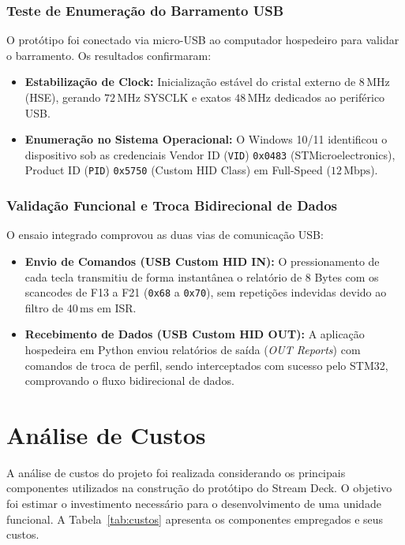 \documentclass[12pt, a4paper]{article}
\begin{document}
\subsubsection{Teste de Enumeração do Barramento USB}
O protótipo foi conectado via micro-USB ao computador hospedeiro para validar o barramento. Os resultados confirmaram:
\begin{itemize}
    \item \textbf{Estabilização de Clock:} Inicialização estável do cristal externo de $8\,\text{MHz}$ (HSE), gerando $72\,\text{MHz}$ SYSCLK e exatos $48\,\text{MHz}$ dedicados ao periférico USB.
    \item \textbf{Enumeração no Sistema Operacional:} O Windows 10/11 identificou o dispositivo sob as credenciais Vendor ID (\texttt{VID}) \texttt{0x0483} (STMicroelectronics), Product ID (\texttt{PID}) \texttt{0x5750} (Custom HID Class) em Full-Speed ($12\,\text{Mbps}$).
\end{itemize}

\subsubsection{Validação Funcional e Troca Bidirecional de Dados}
O ensaio integrado comprovou as duas vias de comunicação USB:
\begin{itemize}
    \item \textbf{Envio de Comandos (USB Custom HID IN):} O pressionamento de cada tecla transmitiu de forma instantânea o relatório de 8 Bytes com os scancodes de F13 a F21 (\texttt{0x68} a \texttt{0x70}), sem repetições indevidas devido ao filtro de $40\,\text{ms}$ em ISR.
    \item \textbf{Recebimento de Dados (USB Custom HID OUT):} A aplicação hospedeira em Python enviou relatórios de saída (\textit{OUT Reports}) com comandos de troca de perfil, sendo interceptados com sucesso pelo STM32, comprovando o fluxo bidirecional de dados.
\end{itemize}

\section{Análise de Custos}
\hspace*{1.25cm}A análise de custos do projeto foi realizada considerando os principais componentes utilizados na construção do protótipo do Stream Deck. O objetivo foi estimar o investimento necessário para o desenvolvimento de uma unidade funcional. A Tabela~\ref{tab:custos} apresenta os componentes empregados e seus custos.
\end{document}
